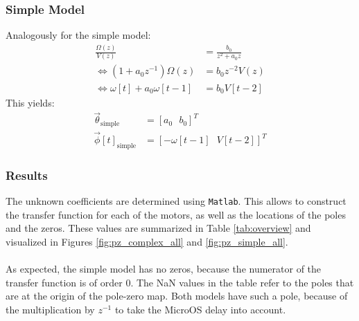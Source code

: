 \documentclass[a4paper,kul]{kulakarticle} %
\begin{document}
\subsubsection*{Simple Model}
Analogously for the simple model:
\begin{equation}
\begin{split}
\frac{\Omega(z)}{V(z)} &= \frac{b_0}{z^2 + a_0 z} \\
\iff (1 + a_0 z^{-1})\Omega(z) &= b_0 z^{-2} V(z) \\	
\iff \omega[t] + a_0 \omega[t-1] &= b_0 V[t-2]
\end{split}
\end{equation}
This yields: 
\begin{equation}
\begin{split}
\vec{\theta}_{\text{simple}} &= \left[a_0\text{ }b_0\right]^T \\
\vec{\phi}[t]_{\text{simple}} &= \left[-\omega[t-1]\text{ }V[t-2]\right]^T
\end{split}
\end{equation}

\subsubsection{Results}
\noindent The unknown coefficients are determined using \texttt{Matlab}. This allows to construct the transfer function for each of the motors, as well as the locations of the poles and the zeros. These values are summarized in Table \ref{tab:overview} and visualized in Figures \ref{fig:pz_complex_all} and \ref{fig:pz_simple_all}.
\\\\
As expected, the simple model has no zeros, because the numerator of the transfer function is of order 0. The NaN values in the table refer to the poles that are at the origin of the pole-zero map. Both models have such a pole, because of the multiplication by $z^{-1}$ to take the MicroOS delay into account. 




\end{document}
